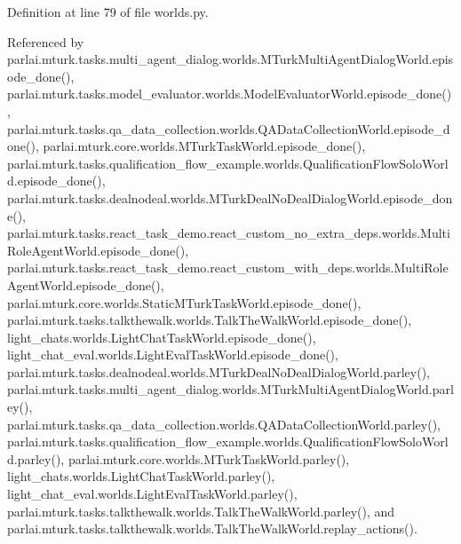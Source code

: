 Definition at line 79 of file worlds.\+py.



Referenced by parlai.\+mturk.\+tasks.\+multi\+\_\+agent\+\_\+dialog.\+worlds.\+M\+Turk\+Multi\+Agent\+Dialog\+World.\+episode\+\_\+done(), parlai.\+mturk.\+tasks.\+model\+\_\+evaluator.\+worlds.\+Model\+Evaluator\+World.\+episode\+\_\+done(), parlai.\+mturk.\+tasks.\+qa\+\_\+data\+\_\+collection.\+worlds.\+Q\+A\+Data\+Collection\+World.\+episode\+\_\+done(), parlai.\+mturk.\+core.\+worlds.\+M\+Turk\+Task\+World.\+episode\+\_\+done(), parlai.\+mturk.\+tasks.\+qualification\+\_\+flow\+\_\+example.\+worlds.\+Qualification\+Flow\+Solo\+World.\+episode\+\_\+done(), parlai.\+mturk.\+tasks.\+dealnodeal.\+worlds.\+M\+Turk\+Deal\+No\+Deal\+Dialog\+World.\+episode\+\_\+done(), parlai.\+mturk.\+tasks.\+react\+\_\+task\+\_\+demo.\+react\+\_\+custom\+\_\+no\+\_\+extra\+\_\+deps.\+worlds.\+Multi\+Role\+Agent\+World.\+episode\+\_\+done(), parlai.\+mturk.\+tasks.\+react\+\_\+task\+\_\+demo.\+react\+\_\+custom\+\_\+with\+\_\+deps.\+worlds.\+Multi\+Role\+Agent\+World.\+episode\+\_\+done(), parlai.\+mturk.\+core.\+worlds.\+Static\+M\+Turk\+Task\+World.\+episode\+\_\+done(), parlai.\+mturk.\+tasks.\+talkthewalk.\+worlds.\+Talk\+The\+Walk\+World.\+episode\+\_\+done(), light\+\_\+chats.\+worlds.\+Light\+Chat\+Task\+World.\+episode\+\_\+done(), light\+\_\+chat\+\_\+eval.\+worlds.\+Light\+Eval\+Task\+World.\+episode\+\_\+done(), parlai.\+mturk.\+tasks.\+dealnodeal.\+worlds.\+M\+Turk\+Deal\+No\+Deal\+Dialog\+World.\+parley(), parlai.\+mturk.\+tasks.\+multi\+\_\+agent\+\_\+dialog.\+worlds.\+M\+Turk\+Multi\+Agent\+Dialog\+World.\+parley(), parlai.\+mturk.\+tasks.\+qa\+\_\+data\+\_\+collection.\+worlds.\+Q\+A\+Data\+Collection\+World.\+parley(), parlai.\+mturk.\+tasks.\+qualification\+\_\+flow\+\_\+example.\+worlds.\+Qualification\+Flow\+Solo\+World.\+parley(), parlai.\+mturk.\+core.\+worlds.\+M\+Turk\+Task\+World.\+parley(), light\+\_\+chats.\+worlds.\+Light\+Chat\+Task\+World.\+parley(), light\+\_\+chat\+\_\+eval.\+worlds.\+Light\+Eval\+Task\+World.\+parley(), parlai.\+mturk.\+tasks.\+talkthewalk.\+worlds.\+Talk\+The\+Walk\+World.\+parley(), and parlai.\+mturk.\+tasks.\+talkthewalk.\+worlds.\+Talk\+The\+Walk\+World.\+replay\+\_\+actions().

\mbox{\label{classparlai_1_1mturk_1_1core_1_1worlds_1_1MTurkTaskWorld_ae9fb1250e0b9a2f77efa255458e47fb3}} 
